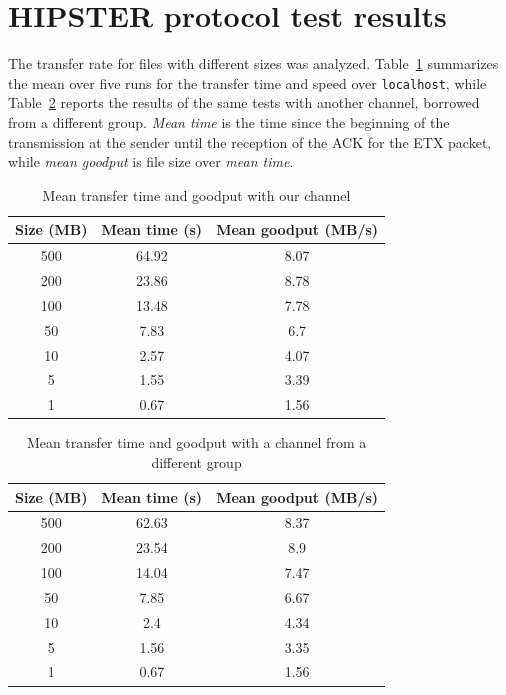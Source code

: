 \documentclass[10pt,twocolumn]{article}
\begin{document}
\section{HIPSTER protocol test results}
The transfer rate for files with different sizes was analyzed.
Table~\ref{table:ourChannel} summarizes the mean over five runs for the
transfer time and speed over \texttt{localhost}, while
Table~\ref{table:anotherChannel} reports the results of the same tests with
another channel, borrowed from a different group. \textit{Mean time} is the time since the beginning of the transmission at the sender until the reception of the ACK for the ETX packet, while \textit{mean goodput} is file size over \textit{mean time}.
\begin{table}[h]
\centering
\begin{tabular}{|c|c|c|}
	Size (MB) & Mean time (s) & Mean goodput (MB/s)\\ \hline
  500       & 64.92    & 8.07  \\
  200       & 23.86    & 8.78  \\
	100       & 13.48    & 7.78  \\
	50        & 7.83     & 6.7 \\
	10        & 2.57     & 4.07 \\
	5         & 1.55     & 3.39  \\
	1         & 0.67     & 1.56  \\ \hline
\end{tabular}
\caption{Mean transfer time and goodput with our channel}
\label{table:ourChannel}
\end{table}

\begin{table}[h]
\centering
\begin{tabular}{|c|c|c|}
  Size (MB) & Mean time (s) & Mean goodput (MB/s)\\ \hline
  500       & 62.63    & 8.37  \\
  200       & 23.54    & 8.9  \\
  100       & 14.04    & 7.47  \\
  50        & 7.85     & 6.67 \\
  10        & 2.4      & 4.34 \\
  5         & 1.56     & 3.35 \\
  1         & 0.67     & 1.56 \\ \hline
\end{tabular}
\caption{Mean transfer time and goodput with a channel from a different group}
\label{table:anotherChannel}
\end{table}
\end{document}
